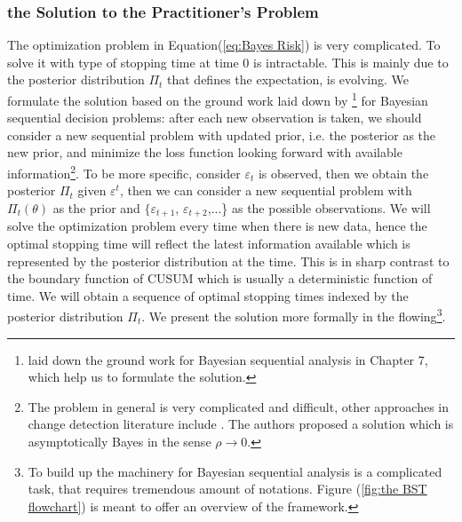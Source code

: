 \documentclass[preprint,authoryear,12pt,english]{elsarticle}
\theoremstyle{plain}
\begin{document}
\subsubsection{the Solution to the Practitioner's Problem}
The optimization problem in Equation(\ref{eq:Bayes Risk}) is very complicated. To solve it with \cite{Shiryaev1963} type of stopping time at time 0 is intractable. This is mainly due to the posterior distribution $\Pi_{t}$ that defines the expectation, is evolving. We formulate the solution based on the ground work laid down by \cite{Berger1985StatisticalAnalysis}\footnote{\cite{Berger1985StatisticalAnalysis} laid down the ground work for Bayesian sequential analysis in Chapter 7, which help us to formulate the solution.} for Bayesian sequential decision problems: after each new observation is taken, we should consider a new sequential problem with updated prior, i.e. the posterior as the new prior, and minimize the loss function looking forward with available information\footnote{The problem in general is very complicated and difficult, other approaches in change detection literature include \cite{Lai2010SequentialUnknown}. The authors proposed a solution which is asymptotically Bayes in the sense $\rho \to 0$.}. To be more specific, consider $\varepsilon_{t}$ is observed, then we obtain the posterior $\Pi_{t}$ given $\varepsilon^{t}$, then we can consider a new sequential problem with $\Pi_{t}(\theta)$ as the prior and $\{ \varepsilon_{t+1}$, $\varepsilon_{t+2}$,...\} as the possible observations. We will solve the optimization problem every time when there is new data, hence the optimal stopping time will reflect the latest information available which is represented by the posterior distribution at the time. This is in sharp contrast to the boundary function of CUSUM which is usually a deterministic function of time.  We will obtain a sequence of optimal stopping times indexed by the posterior distribution $\Pi_{t}$. We present the solution more formally in the flowing\footnote{To build up the machinery for Bayesian sequential analysis is a complicated task, that requires tremendous amount of notations. Figure (\ref{fig:the BST flowchart}) is meant to offer an overview of the framework.}.
\end{document}
